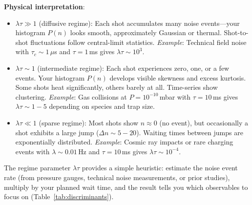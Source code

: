 \textbf{Physical interpretation}:
\begin{itemize}
\item \textbf{$\lambda\tau \gg 1$} (diffusive regime): Each shot accumulates many noise events—your histogram $P(n)$ looks smooth, approximately Gaussian or thermal. Shot-to-shot fluctuations follow central-limit statistics. \emph{Example}: Technical field noise with $\tau_c \sim 1\,\mu$s and $\tau = 1\,$ms gives $\lambda\tau \sim 10^3$.

\item \textbf{$\lambda\tau \sim 1$} (intermediate regime): Each shot experiences zero, one, or a few events. Your histogram $P(n)$ develops visible skewness and excess kurtosis. Some shots heat significantly, others barely at all. Time-series show clustering. \emph{Example}: Gas collisions at $P = 10^{-10}\,$mbar with $\tau = 10\,$ms gives $\lambda\tau \sim 1{-}5$ depending on species and trap size.

\item \textbf{$\lambda\tau \ll 1$} (sparse regime): Most shots show $n \approx 0$ (no event), but occasionally a shot exhibits a large jump ($\Delta n \sim 5{-}20$). Waiting times between jumps are exponentially distributed. \emph{Example}: Cosmic ray impacts or rare charging events with $\lambda \sim 0.01\,$Hz and $\tau = 10\,$ms gives $\lambda\tau \sim 10^{-4}$.
\end{itemize}


The regime parameter $\lambda\tau$ provides a simple heuristic: estimate the noise event rate (from pressure gauges, technical noise measurements, or prior studies), multiply by your planned wait time, and the result tells you which observables to focus on (Table~\ref{tab:discriminants}).

